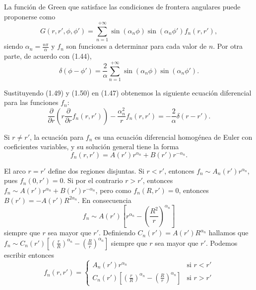 \documentclass[12pt,a4paper]{book}
\begin{document}
La función de Green que satisface las condiciones de frontera angulares puede proponerse como
\begin{equation}
G(r, r', \phi, \phi') = \sum_{n=1}^{+\infty} \sin(\alpha_n \phi) \sin(\alpha_n\phi') f_n(r, r'),
\end{equation}
siendo $\alpha_n = \frac{n\pi}{\alpha}$ y $f_n$ son funciones a determinar para cada valor de $n$. Por otra parte, de acuerdo con (1.44),
\begin{equation}
\delta(\phi - \phi') = \frac{2}{\alpha}\sum_{n=1}^{+\infty} \sin(\alpha_n \phi) \sin(\alpha_n\phi').
\end{equation}

Sustituyendo (1.49) y (1.50) en (1.47) obtenemos la siguiente ecuación diferencial para las funciones $f_n$:
\begin{equation}
\frac{\partial}{\partial r}\left(r \frac{\partial}{\partial r}f_n(r, r')\right) - \frac{\alpha_n^2}{r}f_n(r, r') = -\frac{2}{\alpha}\delta(r - r').
\end{equation}

Si $r \neq r'$, la ecuación para $f_n$ es una ecuación diferencial homogénea de Euler con coeficientes variables, y su solución general tiene la forma
\begin{equation}
f_n(r, r') = A(r')r^{\alpha_n} + B(r')r^{-\alpha_n}.
\end{equation}

El arco $r = r'$ define dos regiones disjuntas. Si $r < r'$, entonces $f_n \sim A_n(r')r^{\alpha_n}$, pues $f_n(0, r') = 0$. Si por el contrario $r > r'$, entonces $f_n \sim A(r')r^{\alpha_n} + B(r')r^{-\alpha_n}$, pero como $f_n(R, r') = 0$, entonces $B(r') = -A(r')R^{2\alpha_n}$. En consecuencia
\begin{equation}
f_n \sim A(r') \left[r^{\alpha_n} - \left(\frac{R^2}{r}\right)^{\alpha_n}\right]
\end{equation}
siempre que $r$ sea mayor que $r'$. Definiendo $C_n(r') = A(r')R^{\alpha_n}$ hallamos que $f_n \sim C_n(r') \left[\left(\frac{r}{R}\right)^{\alpha_n} - \left(\frac{R}{r}\right)^{\alpha_n}\right]$ siempre que $r$ sea mayor que $r'$. Podemos escribir entonces
\begin{equation}
f_n(r, r') = 
\begin{cases}
A_n(r')r^{\alpha_n} & \text{si } r < r' \\
C_n(r')\left[\left(\frac{r}{R}\right)^{\alpha_n} - \left(\frac{R}{r}\right)^{\alpha_n}\right] & \text{si } r > r'
\end{cases}
\end{equation}
\end{document}
